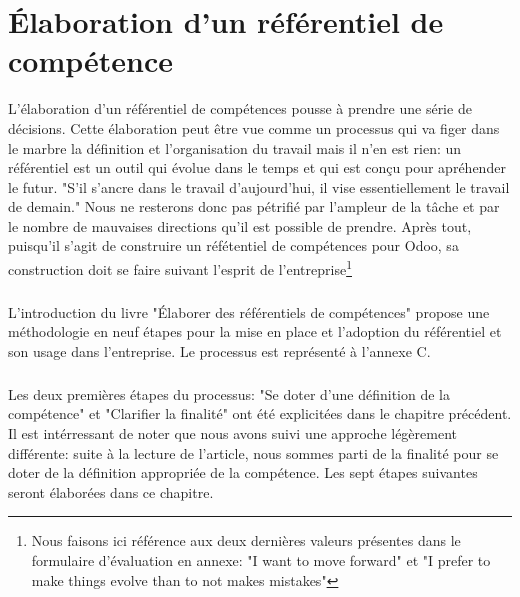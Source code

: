 \chapter{Élaboration d'un référentiel de compétence}
L'élaboration d'un référentiel de compétences pousse à prendre une série de décisions. Cette élaboration peut être vue comme un processus qui va figer dans le marbre la définition et l'organisation du travail mais il n'en est rien: un référentiel est un outil qui évolue dans le temps et qui est conçu pour apréhender le futur. "S'il s'ancre dans le travail d'aujourd'hui, il vise essentiellement le travail de demain."\citep[pp.19]{refcompetence} Nous ne resterons donc pas pétrifié par l'ampleur de la tâche et par le nombre de mauvaises directions qu'il est possible de prendre. Après tout, puisqu'il s'agit de construire un réfétentiel de compétences pour Odoo, sa construction doit se faire suivant l'esprit de l'entreprise\footnote{Nous faisons ici référence aux deux dernières valeurs présentes dans le formulaire d'évaluation en annexe: "I want to move forward" et "I prefer to make things evolve than to not makes mistakes"} 

\paragraph{}L'introduction du livre "Élaborer des référentiels de compétences"\citep{refcompetence} propose une méthodologie en neuf étapes pour la mise en place et l'adoption du référentiel et son usage dans l'entreprise. Le processus est représenté à l'annexe C. 

\paragraph{} Les deux premières étapes du processus: "Se doter d'une définition de la compétence" et "Clarifier la finalité" ont été explicitées dans le chapitre précédent. Il est intérressant de noter que nous avons suivi une approche légèrement différente: suite à la lecture de l'article\citep{delobbe}, nous sommes parti de la finalité pour se doter de la définition appropriée de la compétence. Les sept étapes suivantes seront élaborées dans ce chapitre.

